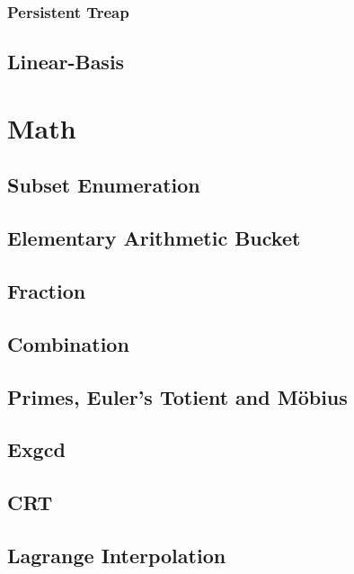 \documentclass[10pt,a4paper]{article}
\newcommand{\codedir}{../code/}
\newcommand{\code}[2][]{%
}
\begin{document}
\begin{multicols}{2}
\subsubsection{Persistent Treap}
\code{Persistent_Treap.cpp}

\subsection{Linear-Basis}
\code{Linear-Basis.cpp}

\newpage

\section{Math}

\subsection{Subset Enumeration}
\code{Subset.cpp}

\subsection{Elementary Arithmetic Bucket}
\code{Arithmetic.cpp}

\subsection{Fraction}
\code{Fraction.cpp}

\subsection{Combination}
\code{Combination.cpp}

\subsection{Primes, Euler's Totient and M\"obius}
\code{Primes.cpp}

\subsection{Exgcd}
\code{exgcd.cpp}

\subsection{CRT}
\code{CRT.cpp}

\subsection{Lagrange Interpolation}
\code{Lagrange.cpp}


\end{multicols}
\end{document}
